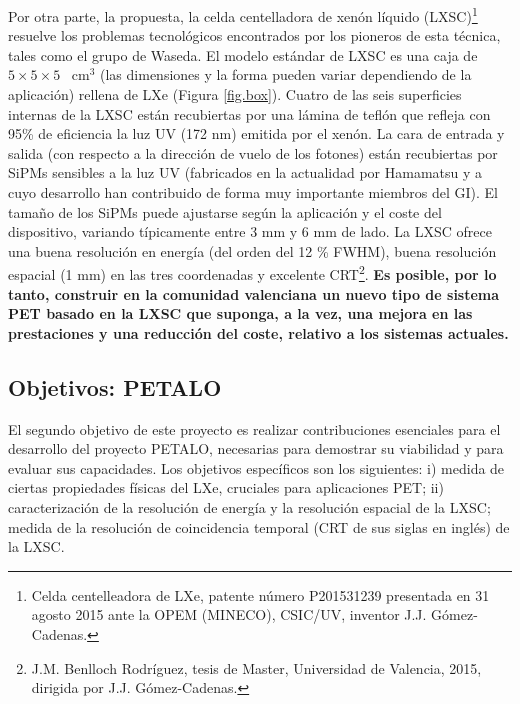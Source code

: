 Por otra parte, la propuesta, la celda centelladora de xenón líquido (LXSC)\footnote{Celda centelleadora de LXe, patente número P201531239 presentada en 31 agosto 2015 ante la OPEM (MINECO), CSIC/UV, inventor J.J. Gómez-Cadenas.} resuelve los problemas tecnológicos encontrados por los pioneros de esta técnica, tales como el grupo de Waseda. El modelo estándar de LXSC es una caja de $5\times 5 \times 5$~ cm$^3$ (las dimensiones y la forma pueden variar dependiendo de la aplicación) rellena de LXe (Figura \ref{fig.box}). Cuatro de las seis superficies internas de la LXSC están recubiertas por una lámina de teflón que refleja con 95\% de eficiencia la luz UV (172 nm) emitida por el xenón. La cara de entrada y salida (con respecto a la dirección de vuelo de los fotones) están recubiertas por SiPMs sensibles a la luz UV (fabricados en la actualidad por Hamamatsu y a cuyo desarrollo han contribuido de forma muy importante miembros del GI). El tamaño de los SiPMs puede ajustarse según la aplicación y el coste del dispositivo, variando típicamente entre 3 mm y 6 mm de lado. La LXSC ofrece una buena resolución en energía (del orden del 12 \% FWHM), buena resolución espacial (1 mm) en las tres coordenadas y excelente CRT\footnote{J.M. Benlloch Rodríguez, tesis de Master, Universidad de Valencia, 2015, dirigida por J.J. Gómez-Cadenas. 
}. {\bf Es posible, por lo tanto, construir en la comunidad valenciana un nuevo tipo de sistema PET basado en la LXSC que suponga, a la vez, una mejora en las prestaciones y una reducción del coste, relativo a los sistemas actuales.}

\subsection*{Objetivos: PETALO}

El segundo objetivo de este proyecto es realizar contribuciones esenciales para el desarrollo del proyecto PETALO, necesarias para demostrar su viabilidad y para evaluar sus capacidades. Los objetivos específicos son los siguientes: i) medida de ciertas propiedades físicas del LXe, cruciales para aplicaciones PET;  ii) caracterización de la resolución de energía y la resolución espacial de la LXSC; medida de la resolución de coincidencia temporal (CRT de sus siglas en inglés) de la LXSC.


